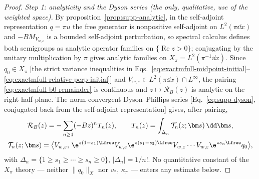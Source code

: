 \begin{proof}
\emph{Step 1: analyticity and the Dyson series (the only, qualitative, use
of the weighted space).}
By proposition~\ref{prop:supp-analytic}, in the self-adjoint representation
\(q=\pi u\) the free generator is nonpositive self-adjoint on
\(L^2(\pi\dd x)\) and \(-BM_{V_{w,\varepsilon}}\) is a bounded self-adjoint
perturbation, so spectral calculus defines both semigroups as analytic
operator families on \(\{\operatorname{Re}z>0\}\); conjugating by the
unitary multiplication by \(\pi\) gives analytic families on
\(X_\pi=L^2(\pi^{-1}\dd x)\).  Since \(q_0\in X_\pi\) [the strict variance
inequalities in Eqs.~\eqref{eq:exactmfull-midpoint-initial}--%
\eqref{eq:exactmfull-relative-perp-initial}] and
\(V_{w,\varepsilon}\in L^2(\pi\dd x)\cap L^\infty\), the pairing
\eqref{eq:exactmfull-b0-remainder} is continuous and
\(z\mapsto\mathcal R_B(z)\) is analytic on the right half-plane.  The
norm-convergent Dyson--Phillips series [Eq.~\eqref{eq:supp-dyson},
conjugated back from the self-adjoint representation] gives, after pairing,
\begin{equation}
 \begin{gathered}
 \mathcal R_B(z)
 =-\sum_{n\ge1}(-Bz)^n T_n(z),
 \qquad
 T_n(z)=\int_{\Delta_n}\mathcal T_n(z;\bm s)\,\dd\bm s,\\
 \mathcal T_n(z;\bm s)
 =\bigl\langle V_{w,\varepsilon},\,
 \e^{z(1-s_1)\Lfree}V_{w,\varepsilon}
 \e^{z(s_1-s_2)\Lfree}V_{w,\varepsilon}\cdots V_{w,\varepsilon}
 \e^{zs_n\Lfree}q_0\bigr\rangle,
 \end{gathered}
 \label{eq:exactmfull-b0-dyson}
\end{equation}
with \(\Delta_n=\{1\ge s_1\ge\cdots\ge s_n\ge0\}\),
\(|\Delta_n|=1/n!\).  No quantitative constant of the \(X_\pi\)
theory --- neither \(\|q_0\|_X\) nor \(v_*\), \(\kappa_\pi\) --- enters any
estimate below.


\end{proof}
